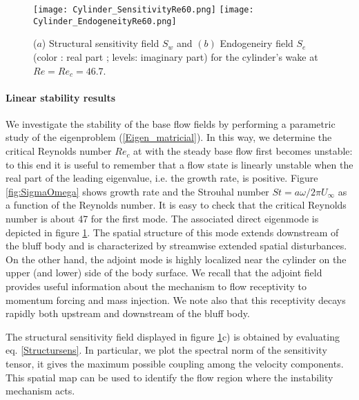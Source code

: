 \documentclass[twocolumn,10pt]{asme2ej}
\begin{document}
\begin{figure}
\texttt{[image: Cylinder\_SensitivityRe60.png]}
\texttt{[image: Cylinder\_EndogeneityRe60.png]}
\caption{ ($a$) Structural sensitivity field $S_w$ and $(b)$ Endogeneiry field $S_e$ (color : real part ; levels: imaginary part) for the cylinder's wake at $Re=Re_c = 46.7$.}
\label{fig:Eigenmode}
\end{figure}




\paragraph{Linear stability results}

We investigate the stability of the base flow fields by performing a parametric study of the eigenproblem 
(\ref{Eigen_matricial}). In this way, we determine the critical Reynolds number $Re_c$ at with the steady base flow
first becomes unstable: to this end it is useful to remember that a flow state is 
linearly unstable when the real part of 
the leading eigenvalue, i.e. the growth rate, is positive. 
Figure \ref{fig:SigmaOmega} shows growth rate and the Strouhal number 
$St=a\omega/2 \pi U_{\infty}$ as a function of the 
Reynolds number. It is easy to check that the critical Reynolds number is about 47 
for the first mode. 
The associated direct eigenmode is depicted in figure \ref{fig:Eigenmode}. The 
spatial structure of this mode 
extends downstream of the bluff body and is characterized by streamwise 
extended spatial disturbances. 
On the other hand, the adjoint mode is highly localized near the cylinder 
on the upper (and lower) side of the body surface. 
We recall that the adjoint field provides useful information about the mechanism to
flow receptivity to momentum forcing and mass injection.
We note also that this receptivity decays rapidly both upstream and downstream 
of the bluff body.

The structural sensitivity field displayed in figure \ref{fig:Eigenmode}c)
is obtained by evaluating eq. \ref{Structursens}.
In particular, we plot the spectral norm of the sensitivity tensor, it 
gives the maximum possible coupling among the velocity components. 
This spatial map can be used to identify the flow region where the 
instability mechanism acts.
\end{document}
